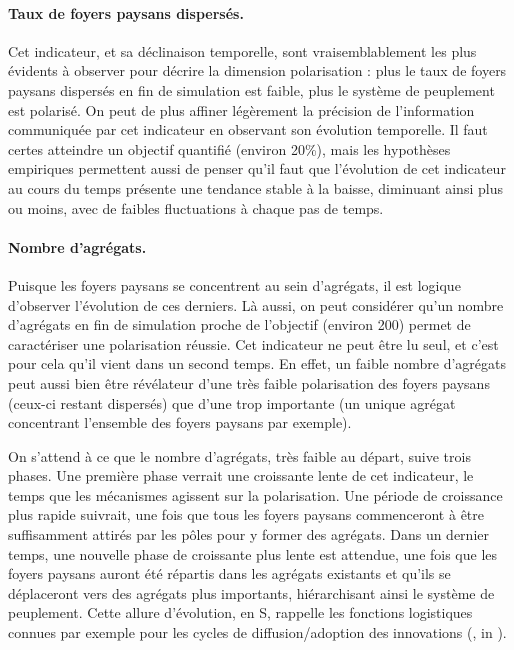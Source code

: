 \paragraph{Taux de foyers paysans dispersés.}

Cet indicateur, et sa déclinaison temporelle, sont vraisemblablement les plus évidents à observer pour décrire la dimension \og polarisation \fg{}:
plus le taux de foyers paysans dispersés en fin de simulation est faible, plus le système de peuplement est polarisé.
On peut de plus affiner légèrement la précision de l'information communiquée par cet indicateur en observant son évolution temporelle.
Il faut certes atteindre un objectif quantifié (environ 20\%), mais les hypothèses empiriques permettent aussi de penser qu'il faut que l'évolution de cet indicateur au cours du temps présente une tendance stable à la baisse, diminuant ainsi plus ou moins, avec de faibles fluctuations à chaque pas de temps.

\paragraph{Nombre d'agrégats.}

Puisque les foyers paysans se concentrent au sein d'agrégats, il est logique d'observer l'évolution de ces derniers.
Là aussi, on peut considérer qu'un nombre d'agrégats en fin de simulation proche de l'objectif (environ 200) permet de caractériser une polarisation réussie.
Cet indicateur ne peut être lu seul, et c'est pour cela qu'il vient dans un second temps.
En effet, un faible nombre d'agrégats peut aussi bien être révélateur d'une très faible polarisation des foyers paysans (ceux-ci restant dispersés) que d'une trop importante (un unique agrégat concentrant l'ensemble des foyers paysans par exemple).

On s'attend à ce que le nombre d'agrégats, très faible au départ, suive trois phases.
Une première phase verrait une croissante lente de cet indicateur, le temps que les mécanismes agissent sur la polarisation.
Une période de croissance plus rapide suivrait, une fois que tous les foyers paysans commenceront à être suffisamment attirés par les pôles pour y former des agrégats.
Dans un dernier temps, une nouvelle phase de croissante plus lente est attendue, une fois que les foyers paysans auront été répartis dans les agrégats existants et qu'ils se déplaceront vers des agrégats plus importants, hiérarchisant ainsi le système de peuplement.
Cette allure d'évolution, en \og S\fg{}, rappelle les fonctions logistiques connues par exemple pour les cycles de diffusion/adoption des innovations (\cite{hagerstrand1952propagation}, in \cite[28]{daude_modelisation_2002}).

